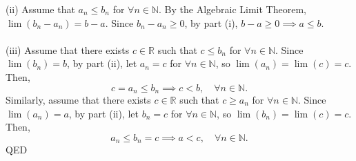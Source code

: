 \documentclass{article}
\begin{document}
                (ii) Assume that $a_n \leq b_n$ for $\forall n \in \mathbb{N}$. By the Algebraic Limit Theorem, $\lim(b_n-a_n)=b-a$. Since $b_n-a_n \geq 0$, by part (i), $b-a \geq 0 \implies a \leq b$.\\ \\
                (iii) Assume that there exists $c \in \mathbb{R}$ such that $c \leq b_n$ for $\forall n \in \mathbb{N}$. Since $\lim(b_n)=b$, by part (ii), let $a_n=c$ for $\forall n \in \mathbb{N}$, so $\lim(a_n)=\lim(c)=c$. Then,
                \begin{equation*}
                    c = a_n \leq b_n \implies c < b, \quad \forall n \in \mathbb{N}.
                \end{equation*}
                Similarly, assume that there exists $c \in \mathbb{R}$ such that $c \geq a_n$ for $\forall n \in \mathbb{N}$. Since $\lim(a_n)=a$, by part (ii), let $b_n=c$ for $\forall n \in \mathbb{N}$, so $\lim(b_n)=\lim(c)=c$. Then,
                \begin{equation*}
                    a_n \leq b_n = c \implies a < c, \quad \forall n \in \mathbb{N}.
                \end{equation*}
                QED
            
\end{document}
